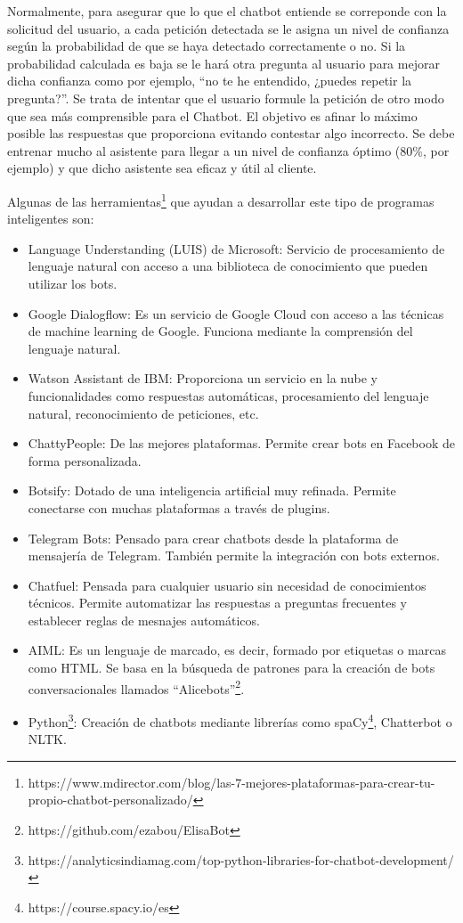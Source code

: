 Normalmente, para asegurar que lo que el chatbot entiende se correponde con la solicitud del usuario, a cada petición detectada se le asigna un nivel de confianza según la probabilidad de que se haya detectado correctamente o no. Si la probabilidad calculada es baja se le hará otra pregunta al usuario para mejorar dicha confianza como por ejemplo, ``no te he entendido, ¿puedes repetir la pregunta?''. Se trata de intentar que el usuario formule la petición de otro modo que sea más comprensible para el Chatbot. El objetivo es afinar lo máximo posible las respuestas que proporciona evitando contestar algo incorrecto. Se debe entrenar mucho al asistente para llegar a un nivel de confianza óptimo (80\%, por ejemplo) y que dicho asistente sea eficaz y útil al cliente.

Algunas de las herramientas\footnote{https://www.mdirector.com/blog/las-7-mejores-plataformas-para-crear-tu-propio-chatbot-personalizado/} que ayudan a desarrollar este tipo de programas inteligentes son:

\begin{itemize}
	\item Language Understanding (LUIS) de Microsoft: Servicio de procesamiento de lenguaje natural con acceso a una biblioteca de conocimiento que pueden utilizar los bots.
	\item Google Dialogflow: Es un servicio de Google Cloud con acceso a las técnicas de machine learning de Google. Funciona mediante la comprensión del lenguaje natural.
	\item Watson Assistant de IBM: Proporciona un servicio en la nube y funcionalidades como respuestas automáticas, procesamiento del lenguaje natural, reconocimiento de peticiones, etc.
	\item ChattyPeople: De las mejores plataformas. Permite crear bots en Facebook de forma personalizada.
	\item Botsify: Dotado de una inteligencia artificial muy refinada. Permite conectarse con muchas plataformas a través de plugins. 
	\item Telegram Bots: Pensado para crear chatbots desde la plataforma de mensajería de Telegram. También permite la integración con bots externos.
	\item Chatfuel: Pensada para cualquier usuario sin necesidad de conocimientos técnicos. Permite automatizar las respuestas a preguntas frecuentes y establecer reglas de mesnajes automáticos.
	\item AIML: Es un lenguaje de marcado, es decir, formado por etiquetas o marcas como HTML. Se basa en la búsqueda de patrones para la creación de bots conversacionales llamados ``Alicebots''\footnote{https://github.com/ezabou/ElisaBot}. 
	\item Python\footnote{https://analyticsindiamag.com/top-python-libraries-for-chatbot-development/}: Creación de chatbots mediante librerías como spaCy\footnote{https://course.spacy.io/es}, Chatterbot o NLTK.
\end{itemize} 

